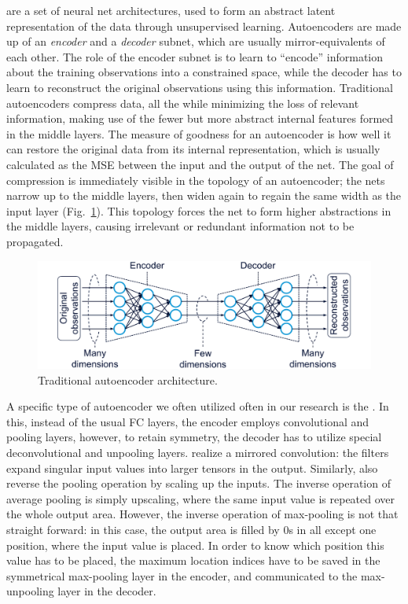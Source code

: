 			 are a set of neural net architectures, used to form an abstract latent representation of the data through unsupervised learning.
			Autoencoders are made up of an \textit{encoder} and a \textit{decoder} subnet, which are usually mirror-equivalents of each other.
			The role of the encoder subnet is to learn to ``encode'' information about the training observations into a constrained space, while the decoder has to learn to reconstruct the original observations using this information.
			Traditional autoencoders compress data, all the while minimizing the loss of relevant information, making use of the fewer but more abstract internal features formed in the middle layers.
			The measure of goodness for an autoencoder is how well it can restore the original data from its internal representation, which is usually calculated as the \ac{MSE} between the input and the output of the net. 
			The goal of compression is immediately visible in the topology of an autoencoder; the nets narrow up to the middle layers, then widen again to regain the same width as the input layer (Fig.~\ref{fig:autoencoder}).
			This topology forces the net to form higher abstractions in the middle layers, causing irrelevant or redundant information not to be propagated.
			
			\begin{figure}[ht]
				\centering
				\includegraphics[width=0.8\linewidth]{figures/02_deep_learning/autoencoder/autoencoder.pdf}
				\caption[Traditional autoencoder architecture]{Traditional autoencoder architecture.}
				\label{fig:autoencoder}
			\end{figure}
			
			A specific type of autoencoder we often utilized often in our research is the .
			In this, instead of the usual \ac{FC} layers, the encoder employs convolutional and pooling layers, however, to retain symmetry, the decoder has to utilize special deconvolutional and unpooling layers.	
			 realize a mirrored convolution: the filters expand singular input values into larger tensors in the output.
			Similarly,  also reverse the pooling operation by scaling up the inputs.
			The inverse operation of average pooling is simply upscaling, where the same input value is repeated over the whole output area.
			However, the inverse operation of max-pooling is not that straight forward: in this case, the output area is filled by $0$s in all except one position, where the input value is placed.
			In order to know which position this value has to be placed, the maximum location indices have to be saved in the symmetrical max-pooling layer in the encoder, and communicated to the max-unpooling layer in the decoder.
			
